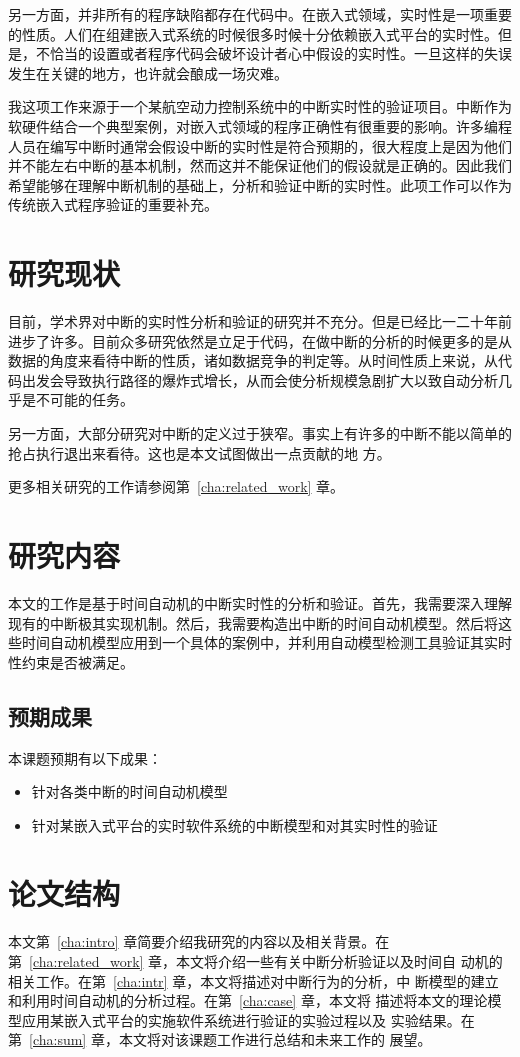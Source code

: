 另一方面，并非所有的程序缺陷都存在代码中。在嵌入式领域，实时性是一项重要
的性质。人们在组建嵌入式系统的时候很多时候十分依赖嵌入式平台的实时性。但
是，不恰当的设置或者程序代码会破坏设计者心中假设的实时性。一旦这样的失误
发生在关键的地方，也许就会酿成一场灾难。

我这项工作来源于一个某航空动力控制系统中的中断实时性的验证项目。中断作为
软硬件结合一个典型案例，对嵌入式领域的程序正确性有很重要的影响。许多编程
人员在编写中断时通常会假设中断的实时性是符合预期的，很大程度上是因为他们
并不能左右中断的基本机制，然而这并不能保证他们的假设就是正确的。因此我们
希望能够在理解中断机制的基础上，分析和验证中断的实时性。此项工作可以作为
传统嵌入式程序验证的重要补充。

\section{研究现状}
\label{sec:study}

目前，学术界对中断的实时性分析和验证的研究并不充分。但是已经比一二十年前
进步了许多。目前众多研究依然是立足于代码，在做中断的分析的时候更多的是从
数据的角度来看待中断的性质，诸如数据竞争的判定等。从时间性质上来说，从代
码出发会导致执行路径的爆炸式增长，从而会使分析规模急剧扩大以致自动分析几
乎是不可能的任务。

另一方面，大部分研究对中断的定义过于狭窄。事实上有许多的中断不能以简单的
抢占\pozhehao 执行\pozhehao 退出来看待。这也是本文试图做出一点贡献的地
方。

更多相关研究的工作请参阅第~\ref{cha:related_work} 章。

\section{研究内容}
\label{sec:subject}
本文的工作是基于时间自动机的中断实时性的分析和验证。首先，我需要深入理解
现有的中断极其实现机制。然后，我需要构造出中断的时间自动机模型。然后将这
些时间自动机模型应用到一个具体的案例中，并利用自动模型检测工具验证其实时
性约束是否被满足。

\subsection{预期成果}
\label{subsec:expectation}
本课题预期有以下成果：
\begin{itemize}
	\item 针对各类中断的时间自动机模型
	\item 针对某嵌入式平台的实时软件系统的中断模型和对其实时性的验证
\end{itemize}

\section{论文结构}
\label{sec:structure}
本文第~\ref{cha:intro} 章简要介绍我研究的内容以及相关背景。在
第~\ref{cha:related_work} 章，本文将介绍一些有关中断分析验证以及时间自
动机的相关工作。在第~\ref{cha:intr} 章，本文将描述对中断行为的分析，中
断模型的建立和利用时间自动机的分析过程。在第~\ref{cha:case} 章，本文将
描述将本文的理论模型应用某嵌入式平台的实施软件系统进行验证的实验过程以及
实验结果。在第~\ref{cha:sum} 章，本文将对该课题工作进行总结和未来工作的
展望。


